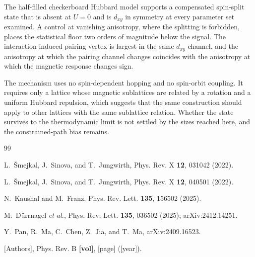 \documentclass[aps,prl,reprint,superscriptaddress,amsmath,amssymb,floatfix]{revtex4-2}
\begin{document}
The half-filled checkerboard Hubbard model supports a compensated spin-split
state that is absent at $U = 0$ and is $d_{xy}$ in symmetry at every parameter
set examined. A control at vanishing anisotropy, where the splitting is
forbidden, places the statistical floor two orders of magnitude below the
signal. The interaction-induced pairing vertex is largest in the same $d_{xy}$
channel, and the anisotropy at which the pairing channel changes coincides with
the anisotropy at which the magnetic response changes sign.

The mechanism uses no spin-dependent hopping and no spin-orbit coupling. It
requires only a lattice whose magnetic sublattices are related by a rotation and
a uniform Hubbard repulsion, which suggests that the same construction should
apply to other lattices with the same sublattice relation. Whether the state
survives to the thermodynamic limit is not settled by the sizes reached here,
and the constrained-path bias remains.

\begin{acknowledgments}
\end{acknowledgments}

\begin{thebibliography}{99}


L.~\v{S}mejkal, J.~Sinova, and T.~Jungwirth,
Phys. Rev. X \textbf{12}, 031042 (2022).

L.~\v{S}mejkal, J.~Sinova, and T.~Jungwirth,
Phys. Rev. X \textbf{12}, 040501 (2022).

N.~Kaushal and M.~Franz,
Phys. Rev. Lett. \textbf{135}, 156502 (2025).

M.~D\"urrnagel \textit{et al.},
Phys. Rev. Lett. \textbf{135}, 036502 (2025);
arXiv:2412.14251.

Y.~Pan, R.~Ma, C.~Chen, Z.~Jia, and T.~Ma,
arXiv:2409.16523.

[Authors], Phys. Rev. B \textbf{[vol]}, [page] ([year]).

\end{thebibliography}
\end{document}
